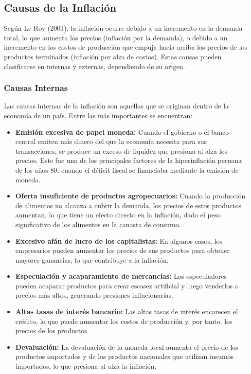 \documentclass[
  stu,
  floatsintext,
  longtable,
  a4paper,
  nolmodern,
  notxfonts,
  notimes,
  12pt,
  colorlinks=true,linkcolor=blue,citecolor=blue,urlcolor=blue]{apa7}
\providecommand{\tightlist}{%
  \setlength{\itemsep}{0pt}\setlength{\parskip}{0pt}}
\begin{document}
\subsection{Causas de la Inflación}\label{causas-de-la-inflaciuxf3n}

Según Le Roy (2001), la inflación ocurre debido a un incremento en la
demanda total, lo que aumenta los precios (inflación por la demanda), o
debido a un incremento en los costos de producción que empuja hacia
arriba los precios de los productos terminados (inflación por alza de
costos). Estas causas pueden clasificarse en internas y externas,
dependiendo de su origen.

\subsubsection{Causas Internas}\label{causas-internas}

Las causas internas de la inflación son aquellas que se originan dentro
de la economía de un país. Entre las más importantes se encuentran:

\begin{itemize}
\tightlist
\item
  \textbf{Emisión excesiva de papel moneda:} Cuando el gobierno o el
  banco central emiten más dinero del que la economía necesita para sus
  transacciones, se produce un exceso de liquidez que presiona al alza
  los precios. Este fue uno de los principales factores de la
  hiperinflación peruana de los años 80, cuando el déficit fiscal se
  financiaba mediante la emisión de moneda.
\item
  \textbf{Oferta insuficiente de productos agropecuarios:} Cuando la
  producción de alimentos no alcanza a cubrir la demanda, los precios de
  estos productos aumentan, lo que tiene un efecto directo en la
  inflación, dado el peso significativo de los alimentos en la canasta
  de consumo.
\item
  \textbf{Excesivo afán de lucro de los capitalistas:} En algunos casos,
  los empresarios pueden aumentar los precios de sus productos para
  obtener mayores ganancias, lo que contribuye a la inflación.
\item
  \textbf{Especulación y acaparamiento de mercancías:} Los especuladores
  pueden acaparar productos para crear escasez artificial y luego
  venderlos a precios más altos, generando presiones inflacionarias.
\item
  \textbf{Altas tasas de interés bancario:} Las altas tasas de interés
  encarecen el crédito, lo que puede aumentar los costos de producción
  y, por tanto, los precios de los productos.
\item
  \textbf{Devaluación:} La devaluación de la moneda local aumenta el
  precio de los productos importados y de los productos nacionales que
  utilizan insumos importados, lo que presiona al alza la inflación.
\end{itemize}
\end{document}
